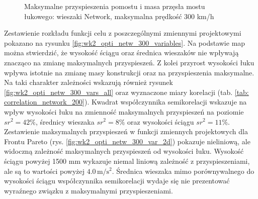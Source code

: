 \begin{figure}[hbt!]
	\centering
	\captionsetup{justification=centering}
	\caption{Maksymalne przyspieszenia pomostu i masa przęsła mostu łukowego: wieszaki Network, maksymalna prędkość 300 km/h}
	\label{fig:wk2_opti_netw_300_all}
\end{figure}

Zestawienie rozkładu funkcji celu z poszczególnymi zmiennymi projektowymi pokazano na rysunku \ref{fig:wk2_opti_netw_300_variables}. Na podstawie map można stwierdzić, że wysokość ściągu oraz średnica wieszaków nie wpływają znacząco na zmianę maksymalnych przyspieszeń. Z kolei przyrost wysokości łuku wpływa istotnie na zmianę masy konstrukcji oraz na przyspieszenia maksymalne. Na taki charakter zależności wskazują również rysunek \ref{fig:wk2_opti_netw_300_vars_all} oraz wyznaczone miary korelacji (tab. \ref{tab: correlation_network_200}). Kwadrat współczynnika semikorelacji wskazuje na wpływ wysokości łuku na zmienność maksymalnych przyspieszeń na poziomie $sr^2=42\%$, średnicy wieszaka $sr^2 = 8\%$ oraz wysokości ściągu $sr^2 = 11\%$. Zestawienie maksymalnych przyspieszeń w funkcji zmiennych projektowych dla Frontu Pareto (rys. \ref{fig:wk2_opti_netw_300_var_2d}) pokazuje nieliniową, ale widoczną zależność maksymalnych przyspieszeń od wysokości łuku. Wysokość ściągu powyżej 1500 mm wykazuje niemal liniową zależność z przyspieszeniami, ale są to wartości powyżej $4.0\,\mathrm{m/s^2}$. Średnica wieszaka mimo porównywalnego do wysokości ściągu współczynnika semikorelacji wydaje się nie prezentować wyraźnego związku z maksymalnymi przyspieszeniami.

